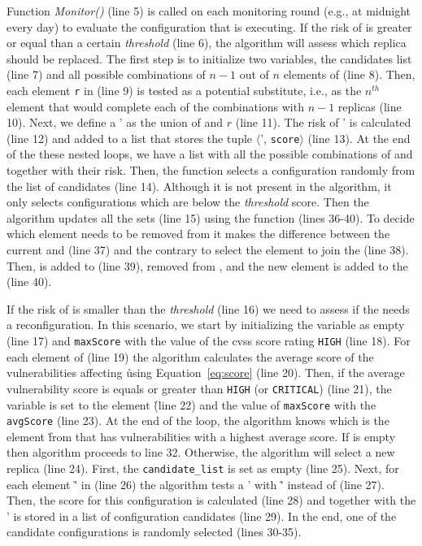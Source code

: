 Function \emph{Monitor()} (line 5) is called on each monitoring round (e.g., at midnight every day) to evaluate the configuration that is executing.
If the risk of \ES is greater or equal than a certain \emph{threshold} (line 6), the algorithm will assess which replica should be replaced.
The first step is to initialize two variables, the candidates list (line 7) and all possible combinations of $n-1$ out of $n$ elements of \ES (line 8).
Then, each element \texttt{r} in \RS (line 9) is tested as a potential substitute, i.e., as the $n^{th}$ element that would complete each of the combinations \COMB with $n-1$ replicas (line 10).
Next, we define a \ES' as the union of \COMB and $r$ (line 11).
The risk of \ES' is calculated (line 12) and added to a list that stores the tuple $\langle$\ES', \texttt{score}$\rangle$ (line 13). 
At the end of the these nested loops, we have a list with all the possible combinations of \ES and \RS together with their risk.
Then, the function \Rand selects a configuration randomly from the list of candidates (line 14). 
Although it is not present in the algorithm, it only selects configurations which are below the \emph{threshold} score. 
Then the algorithm updates all the sets (line 15) using the function \Replace (lines 36-40). 
To decide which element needs to be removed from \ES it makes the difference between the current \ES and \SC (line 37) and the contrary to select the element to join the \ES (line 38).
Then, \toRemove is added to \QS (line 39), removed from \ES, and the new element is added to the \ES (line 40).
 

If the risk of \ES is smaller than the \emph{threshold} (line 16) we need to assess if the \ES needs a reconfiguration.
In this scenario, we start by initializing the variable \toRemove as empty (line 17) and \texttt{maxScore} with the value of the \gls{cvss} score rating \texttt{HIGH} (line 18).
For each element of \ES (line 19) the algorithm calculates the average score of the vulnerabilities affecting \r using Equation~\ref{eq:score} (line 20).
Then, if the average vulnerability score is equals or greater than \texttt{HIGH} (or \texttt{CRITICAL}) (line 21), the variable \toRemove is set to the element \r (line 22) and the value of \texttt{maxScore} with the \texttt{avgScore} (line 23).
At the end of the loop, the algorithm knows which is the element \r from \ES that has vulnerabilities with a highest average score.
If \toRemove is empty then algorithm proceeds to line 32. 
Otherwise, the algorithm will select a new replica (line 24).
First, the \texttt{candidate\_list} is set as empty (line 25).
Next, for each element \r' in \RS (line 26) the algorithm tests a \ES' with \r' instead of \toRemove (line 27).
Then, the score for this configuration is calculated (line 28) and together with the \ES' is stored in a list of configuration candidates (line 29).
In the end, one of the candidate configurations is randomly selected (lines 30-35).

